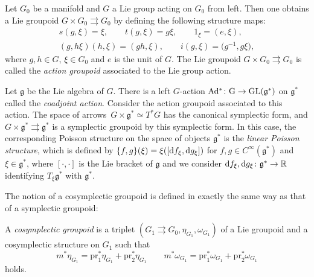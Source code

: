 \documentclass[10pt,a4paper]{amsart}
\numberwithin{equation}{section}
\begin{document}
\begin{Example}
 Let $G_0$ be a manifold and $G$ a Lie group acting on $G_0$ from left. Then one obtains a Lie groupoid $G\times G_0\rightrightarrows G_0$ by defining the following structure maps:
 \begin{gather*}
 s(g,\xi)=\xi,\qquad t(g,\xi)=g\xi,\qquad 1_{\xi}=(e,\xi),\\
 (g,h\xi)(h,\xi)=(gh,\xi),\qquad i(g,\xi)=\bigl(g^{-1},g\xi\bigr),
 \end{gather*}
 where $g,h\in G$, $ \xi\in G_0$ and $e$ is the unit of $G$. The Lie groupoid $G\times G_0\rightrightarrows G_0$ is called the \textit{action groupoid} associated to the Lie group action.

 Let $\mathfrak{g}$ be the Lie algebra of $G$. There is a left $G$-action $\rm{Ad^\ast\colon G\to\rm{GL}(\mathfrak{g}^\ast)}$ on $\mathfrak{g}^\ast$ called the \textit{coadjoint action}. Consider the action groupoid associated to this action. The space of arrows~${G\times\mathfrak{g}^\ast\simeq T^\ast G}$ has the canonical symplectic form, and $G\times\mathfrak{g}^\ast\rightrightarrows\mathfrak{g}^\ast$ is a symplectic groupoid by this symplectic form. In this case, the corresponding Poisson structure on the space of objects $\mathfrak{g}^\ast$ is the \textit{linear Poisson structure}, which is defined by
 $\{f,g\}(\xi)=\xi([{\rm d}f_\xi,{\rm d}g_\xi])$
 for $f,g\in C^\infty(\mathfrak{g}^\ast)$ and $\xi\in\mathfrak{g}^\ast$, where $[\cdot,\cdot]$ is the Lie bracket of $\mathfrak{g}$ and we consider ${\rm d}f_\xi,{\rm d}g_\xi\colon \mathfrak{g}^\ast\to\mathbb{R}$ identifying $T_\xi\mathfrak{g}^\ast$ with $\mathfrak{g}^\ast$.
\end{Example}


The notion of a cosymplectic groupoid is defined in exactly the same way as that of a symplectic groupoid:
\begin{Definition}
 A \textit{cosymplectic groupoid} is a triplet $(G_1\rightrightarrows G_0, \eta_{G_1}, \omega_{G_1})$ of a Lie groupoid and a cosymplectic structure on $G_1$ such that
 \[m^\ast\eta_{G_1}=\textrm{pr}_1^\ast\eta_{G_1}+\textrm{pr}_2^\ast\eta_{G_1}\qquad m^\ast\omega_{G_1}=\textrm{pr}_1^\ast\omega_{G_1}+\textrm{pr}_2^\ast\omega_{G_1}\]
 holds.
\end{Definition}
\end{document}
